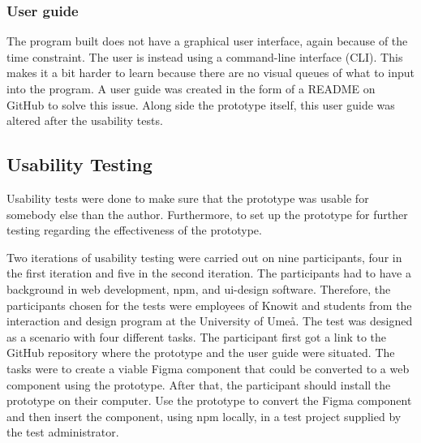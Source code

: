 \subsubsection{User guide}%
\label{ssub:Userguide}
The program built does not have a graphical user interface, again because of the time constraint. The user is instead using a command-line interface (CLI). This makes it a bit harder to learn because there are no visual queues of what to input into the program.  A user guide was created in the form of a README on GitHub \cite{BuildSoftwareBetter} to solve this issue. Along side the prototype itself, this user guide was altered after the usability tests.










\subsection{Usability Testing}%
\label{sub:usertesting}
Usability tests were done to make sure that the prototype was usable for somebody else than the author. Furthermore, to set up the prototype for further testing regarding the effectiveness of the prototype.

Two iterations of usability testing were carried out on nine participants, four in the first iteration and five in the second iteration. The participants had to have a background in web development, \acrshort{npm}, and \acrshort{ui}-design software. Therefore, the participants chosen for the tests were employees of Knowit and students from the interaction and design program at the University of Umeå. The test was designed as a scenario with four different tasks. The participant first got a link to the GitHub repository where the prototype and the user guide were situated. The tasks were to create a viable Figma \gls{component} that could be converted to a web \gls{component} using the prototype. After that, the participant should install the prototype on their computer. Use the prototype to convert the Figma \gls{component} and then insert the \gls{component}, using \acrshort{npm} locally, in a test project supplied by the test administrator.

